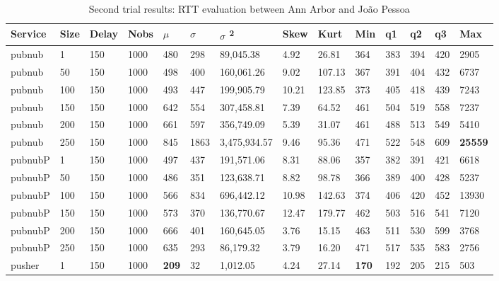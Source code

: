 \begin{table}[!htb]
	\small
	\centering
	\caption{Second trial results: RTT evaluation between Ann Arbor and João Pessoa}
	\label{tab:secondtrialarbjpa}
	\begin{tabular}{llllllllllllll}
		Service    & Size & Delay & Nobs & $\mu$ & $\sigma$  & $\sigma$ \textsuperscript{2} & Skew & Kurt & Min & q1   & q2   & q3   & Max   \\ \midrule
		pubnub     & 1            & 150   & 1000 & 480  & 298  & 89,045.38    & 4.92     & 26.81    & 364 & 383 & 394 & 420 & 2905  \\
		pubnub     & 50           & 150   & 1000 & 498  & 400  & 160,061.26   & 9.02     & 107.13   & 367 & 391 & 404 & 432 & 6737  \\
		pubnub     & 100          & 150   & 1000 & 493  & 447  & 199,905.79   & 10.21    & 123.85   & 373 & 405 & 418 & 439 & 7243  \\
		pubnub     & 150          & 150   & 1000 & 642  & 554  & 307,458.81   & 7.39     & 64.52    & 461 & 504 & 519 & 558 & 7237  \\
		pubnub     & 200          & 150   & 1000 & 661  & 597  & 356,749.09   & 5.39     & 31.07    & 461 & 488 & 513 & 549 & 5410  \\
		pubnub     & 250          & 150   & 1000 & 845  & 1863 & 3,475,934.57 & 9.46     & 95.36    & 471 & 522 & 548 & 609 & \textbf{25559} \\ \hline
		pubnubP & 1            & 150   & 1000 & 497  & 437  & 191,571.06   & 8.31     & 88.06    & 357 & 382 & 391 & 421 & 6618  \\
		pubnubP & 50           & 150   & 1000 & 486  & 351  & 123,638.71   & 8.82     & 98.78    & 366 & 389 & 400 & 428 & 5237  \\
		pubnubP & 100          & 150   & 1000 & 566  & 834  & 696,442.12   & 10.98    & 142.63   & 374 & 406 & 420 & 452 & 13930 \\
		pubnubP & 150          & 150   & 1000 & 573  & 370  & 136,770.67   & 12.47    & 179.77   & 462 & 503 & 516 & 541 & 7120  \\
		pubnubP & 200          & 150   & 1000 & 666  & 401  & 160,645.05   & 3.76     & 15.15    & 463 & 511 & 530 & 599 & 3768  \\
		pubnubP & 250          & 150   & 1000 & 635  & 293  & 86,179.32    & 3.79     & 16.20    & 471 & 517 & 535 & 583 & 2756  \\ \hline
		pusher     & 1            & 150   & 1000 & \textbf{209}  & 32   & 1,012.05     & 4.24     & 27.14    & \textbf{170} & 192 & 205 & 215 & 503   \\

\end{tabular}
\end{table}

